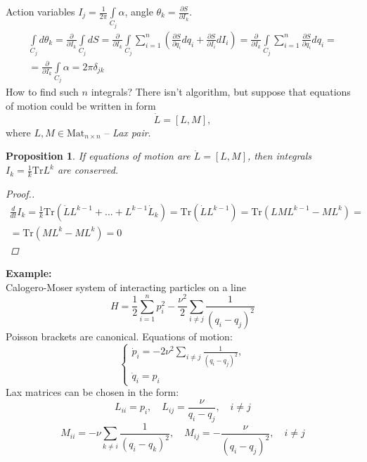 \documentclass[12pt]{article}
\newtheorem{prop}[theorem]{Proposition}
\theoremstyle{definition}
\begin{document}
Action variables $I_j=\frac{1}{2\pi}\int\limits_{C_j}\alpha$, angle $\theta_k=\frac{\partial S}{\partial I_k}$.
\begin{multline}
    \int\limits_{C_j}d\theta_k=\frac{\partial}{\partial I_k}\int\limits_{C_j}dS=\frac{\partial}{\partial I_k}\int\limits_{C_j}\sum\limits_{i=1}^n\left(\frac{\partial S}{\partial q_i}dq_i+\frac{\partial S}{\partial I_i}dI_i\right)=\frac{\partial}{\partial I_k}\int\limits_{C_j}\sum\limits_{i=1}^n\frac{\partial S}{\partial q_i}dq_i=\\=\frac{\partial}{\partial I_k}\int\limits_{C_j}\alpha=2\pi\delta_{jk}
\end{multline}
How to find such $n$ integrals? There isn't algorithm, but suppose that equations of motion could be written in form
\begin{equation}
    \dot{L}=[L,M],
\end{equation}
where $L,M\in\text{Mat}_{n\times n}$ -- \textit{Lax pair}.
\begin{prop}
    If equations of motion are $\dot{L}=[L,M]$, then integrals $I_k=\frac{1}{k}\text{Tr}L^k$ are conserved.
    \begin{proof}[Proof.]
        \begin{multline}
            \frac{d}{dt}I_k=\frac{1}{k}\text{Tr}(\dot{L}L^{k-1}+...+L^{k-1}\dot{L}_k)=\text{Tr}(\dot{L}L^{k-1})=\text{Tr}(LML^{k-1}-ML^k)=\\=\text{Tr}(ML^k-ML^k)=0
        \end{multline}
    \end{proof}
\end{prop}
\textbf{Example:}\\
Calogero-Moser system of interacting particles on a line
\begin{equation}
    H=\frac{1}{2}\sum\limits_{i=1}^np_i^2-\frac{\nu^2}{2}\sum\limits_{i\neq j}\frac{1}{(q_i-q_j)^2}
\end{equation}
Poisson brackets are canonical. Equations of motion:
\begin{equation}
    \begin{cases}
        \dot{p}_i=-2\nu^2\sum\limits_{i\neq j}\frac{1}{(q_i-q_j)^2},\\
        \dot{q}_i=p_i
    \end{cases}
\end{equation}
Lax matrices can be chosen in the form:
\begin{equation}
    L_{ii}=p_i,\quad L_{ij}=\frac{\nu}{q_i-q_j},\quad i\neq j
\end{equation}
\begin{equation}
    M_{ii}=-\nu\sum\limits_{k\neq i}\frac{1}{(q_i-q_k)^2},\quad M_{ij}=-\frac{\nu}{(q_i-q_j)^2},\quad i\neq j
\end{equation}
\end{document}
